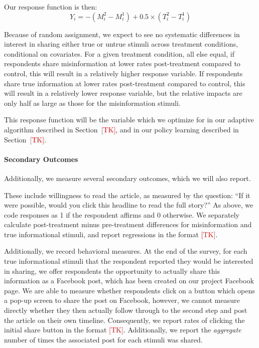 \documentclass[letterpaper, 12pt, parskip=full,]{scrartcl}
\begin{document}
Our response function is then:
\[
Y_i = -(M_i^2 - M_i^1) + 0.5 \times (T_i^2 - T_i^1)
\]

Because of random assignment, we expect to see no systematic differences in interest in sharing either true or untrue stimuli across treatment conditions, conditional on covariates. For a given treatment condition, all else equal, if respondents share misinformation at lower rates post-treatment compared to control, this will result in a relatively higher response variable. If respondents share true information at lower rates post-treatment compared to control, this will result in a relatively lower response variable, but the relative impacts are only half as large as those for the misinformation stimuli. 

This response function will be the variable which we optimize for in our adaptive algorithm described in Section~\textcolor{red}{[TK]}, and in our policy learning described in Section~\textcolor{red}{[TK]}. 

\paragraph{Secondary Outcomes}
Additionally, we measure several secondary outcomes, which we will also report. 

These include willingness to read the article, as measured by the question: ``If it were possible, would you click this headline to read the full story?'' As above, we code responses as 1 if the respondent affirms and 0 otherwise. We separately calculate post-treatment minus pre-treatment differences for misinformation and true informational stimuli, and report regressions in the format \textcolor{red}{[TK]}. 

Additionally, we record behavioral measures. At the end of the survey, for each true informational stimuli that the respondent reported they would be interested in sharing, we offer respondents the opportunity to actually share this information as a Facebook post, which has been created on our project Facebook page. We are able to measure whether respondents click on a button which opens a pop-up screen to share the post on Facebook, however, we cannot measure directly whether they then actually follow through to the second step and post the article on their own timeline. Consequently, we report rates of clicking the initial share button in the format \textcolor{red}{[TK]}. Additionally, we report the \textit{aggregate} number of times the associated post for each stimuli was shared.  
\end{document}
